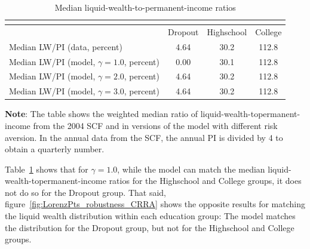 \documentclass[../HAFiscal]{subfiles}
\begin{document}
\begin{table}[th]
\begin{center}
\begin{tabular}{lccc}
	\multicolumn{4}{l}{} \\ \midrule
	& Dropout & Highschool & College \\ \midrule
	Median LW/PI (data, percent) & 4.64 & 30.2 & 112.8 \\ 
	Median LW/PI (model, $\gamma = 1.0$, percent) & 0.00 & 30.1 & 112.8 \\	
	Median LW/PI (model, $\gamma = 2.0$, percent) & 4.64 & 30.2 & 112.8 \\
	Median LW/PI (model, $\gamma = 3.0$, percent) & 4.64 & 30.2 & 112.8 \\ \bottomrule
\end{tabular}
\caption{Median liquid-wealth-to-permanent-income ratios}
\label{tab:robustness_gamma_mlwpi}	
\parbox{15cm}{\small \vspace{.05cm} \textbf{Note}: The table shows the weighted median ratio of liquid-wealth-topermanent-income from the 2004 SCF and in versions of the model with different risk aversion. In the annual data from the SCF, the annual PI is divided by 4 to obtain a quarterly number.\normalsize}
\end{center}
\end{table}

Table~\ref{tab:robustness_gamma_mlwpi} shows that for $\gamma=1.0$, while the model can match the median liquid-wealth-topermanent-income ratios for the Highschool and College groups, it does not do so for the Dropout group. That said, figure~\ref{fig:LorenzPts_robustness_CRRA} shows the opposite results for matching the liquid wealth distribution within each education group: The model matches the distribution for the Dropout group, but not for the Highschool and College groups. 
\end{document}
